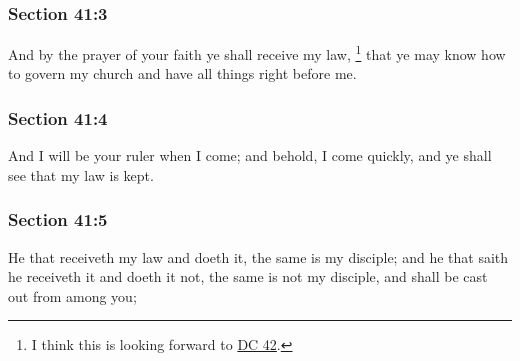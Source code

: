 	\subsubsection{Section 41:3} %
		\label{DC41-3}

		And by the prayer of your faith ye shall receive my law,%
			\footnote{%
				I think this is looking forward to \hyperref[DC42]{DC 42}.
				}
		that ye may know how to govern my church and have all things right before me.


	\subsubsection{Section 41:4} %
		\label{DC41-4}

		And I will be your ruler when I come; and behold, I come quickly, and ye shall see that my law is kept.


	\subsubsection{Section 41:5} %
		\label{DC41-5}

		He that receiveth my law and doeth it, the same is my disciple; and he that saith he receiveth it and doeth it not, the same is not my disciple, and shall be cast out from among you;


